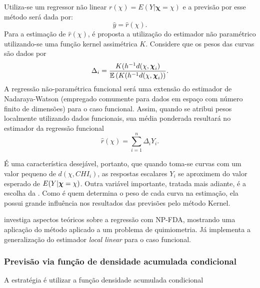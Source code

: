 \documentclass[
	12pt,				%
	openright,			%
	oneside,			%
	a4paper,			%
	english,			%
	brazil				%
	]{dissertacao-ufrgs-abntex2}
\begin{document}
Utiliza-se um regressor não linear $r(\chi)=E(Y|\boldsymbol{\chi}=\chi)$
e a previsão por esse método será dada por:
\[
\hat{y}=\hat{r}(\chi).
\]
Para a estimação de $\hat{r}(\chi)$, é proposta a utilização do estimador
não paramétrico utilizando-se uma função kernel assimétrica $K$. Considere que os pesos das curvas são dados por
\begin{equation} \label{peso-local}
\Delta_i=\frac{K(h^{-1}d(\chi,\boldsymbol{\chi}_{i})}{\mathbb{E} \left( K(h^{-1}d(\chi,\boldsymbol{\chi}_{i}) \right)}.
\end{equation}
A regressão não-paramétrica funcional será uma extensão do estimador de Nadaraya-Watson (empregado comumente para dados em espaço com número finito de dimensões) para o caso funcional. 
Assim, quando se atribui pesos localmente utilizando dados funcionais, sua média ponderada resultará no estimador da regressão funcional
\begin{equation}
	\hat{r}(\chi) = \sum_{i=1}^n \Delta_i Y_i.
\end{equation}

É uma característica desejável, portanto, que quando toma-se curvas com um valor pequeno de $d(\chi,CHI_i)$, as respostas escalares $Y_i$ se aproximem do valor esperado de $E(Y|\boldsymbol{\chi} = \chi)$. Outra variável importante, tratada mais adiante, é a escolha da \bw. Como é \bw quem determina o peso de cada curva na estimação, ela possui grande influência nos resultados das previsões pelo método Kernel.

 investiga aspectos teóricos sobre a regressão com NP-FDA, mostrando uma aplicação do método aplicado a um problema de quimiometria. Já  implementa a generalização do estimador \emph{local linear} para o caso funcional.


\subsubsection*{Previsão via função de densidade acumulada condicional}

A estratégia é utilizar a função densidade acumulada condicional
\end{document}
